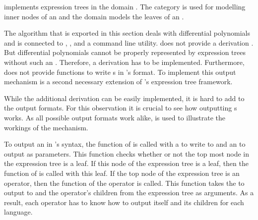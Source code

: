 \LibAlgebra  implements expression trees in the domain . The category  is used for modelling inner nodes of an  and the domain  models the leaves of an .


The algorithm that is exported in this section deals with differential polynomials and is connected to \Maple, \Mathematica, and a command line utility. 
\LibAlgebra does not provide a derivation . But differential polynomials cannot be properly represented by expression trees without such an . Therefore, a derivation  has to be implemented. Furthermore, \LibAlgebra does not provide functions to write s in \Mathematica's format. To implement this output mechanism is a second necessary extension of \LibAlgebra's expression tree framework.

While the additional derivation  can be easily implemented, it is hard to add \Mathematica to the output formats. For this observation it is crucial to see how outputting s works. As all possible output formats work alike, \Maple is used to illustrate the workings of the mechanism. 

To output an  in \Maple's syntax, the function  of  is called with a  to write to and an  to output as parameters. This function checks whether or not the top most node in the expression tree is a leaf. If this node of the expression tree is a leaf, then the  function of  is called with this leaf. If the top node of the expression tree is an operator, then the  function of the operator is called. This function takes the  to output to and the operator's children from the expression tree as arguments. As a result, each operator has to know how to output itself and its children for each language.

